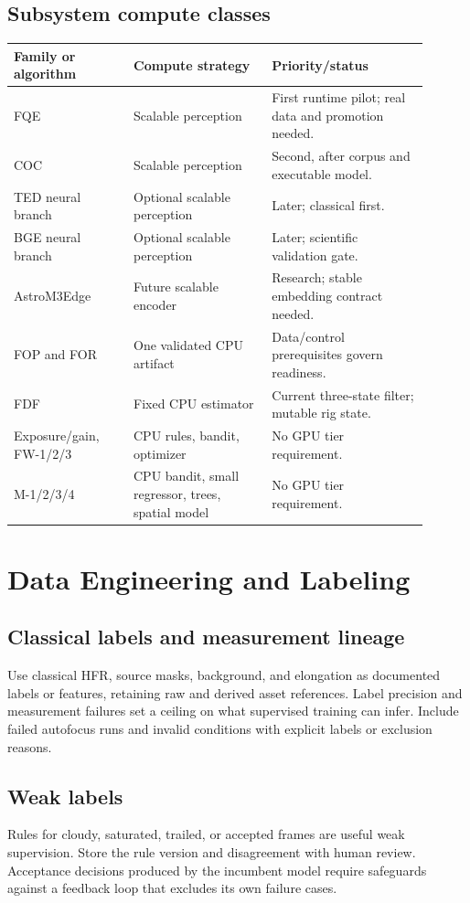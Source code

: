 \documentclass[11pt,a4paper]{article}
\begin{document}
\subsection{Subsystem compute classes}
\begin{longtable}{@{}L{0.26\linewidth}L{0.30\linewidth}L{0.34\linewidth}@{}}
\toprule Family or algorithm & Compute strategy & Priority/status\\\midrule\endhead
FQE & Scalable perception & First runtime pilot; real data and promotion needed.\\
COC & Scalable perception & Second, after corpus and executable model.\\
TED neural branch & Optional scalable perception & Later; classical first.\\
BGE neural branch & Optional scalable perception & Later; scientific validation gate.\\
AstroM3Edge & Future scalable encoder & Research; stable embedding contract needed.\\
FOP and FOR & One validated CPU artifact & Data/control prerequisites govern readiness.\\
FDF & Fixed CPU estimator & Current three-state filter; mutable rig state.\\
Exposure/gain, FW-1/2/3 & CPU rules, bandit, optimizer & No GPU tier requirement.\\
M-1/2/3/4 & CPU bandit, small regressor, trees, spatial model & No GPU tier requirement.\\
\bottomrule
\end{longtable}

\section{Data Engineering and Labeling}
\subsection{Classical labels and measurement lineage}
Use classical HFR, source masks, background, and elongation as documented
labels or features, retaining raw and derived asset references. Label precision
and measurement failures set a ceiling on what supervised training can infer.
Include failed autofocus runs and invalid conditions with explicit labels or
exclusion reasons.

\subsection{Weak labels}
Rules for cloudy, saturated, trailed, or accepted frames are useful weak
supervision. Store the rule version and disagreement with human review.
Acceptance decisions produced by the incumbent model require safeguards
against a feedback loop that excludes its own failure cases.
\end{document}
